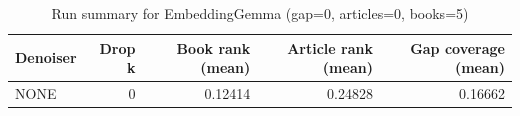 \begin{table}
\caption{Run summary for EmbeddingGemma (gap=0, articles=0, books=5)}
\label{tab:summary_gap0_embeddinggemma_a0_b5}
\begin{tabular}{lrrrr}
\toprule
Denoiser & Drop k & Book rank (mean) & Article rank (mean) & Gap coverage (mean) \\
\midrule
NONE & 0 & 0.12414 & 0.24828 & 0.16662 \\
\bottomrule
\end{tabular}
\end{table}